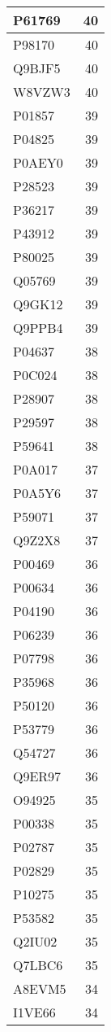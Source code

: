\documentclass[
]{book}
\theoremstyle{definition}
\theoremstyle{definition}
\theoremstyle{definition}
\theoremstyle{definition}
\theoremstyle{remark}
\begin{document}
\begin{table}
\begin{tabular}{l|r}
\hline
P61769 & 40\\
\hline
P98170 & 40\\
\hline
Q9BJF5 & 40\\
\hline
W8VZW3 & 40\\
\hline
P01857 & 39\\
\hline
P04825 & 39\\
\hline
P0AEY0 & 39\\
\hline
P28523 & 39\\
\hline
P36217 & 39\\
\hline
P43912 & 39\\
\hline
P80025 & 39\\
\hline
Q05769 & 39\\
\hline
Q9GK12 & 39\\
\hline
Q9PPB4 & 39\\
\hline
P04637 & 38\\
\hline
P0C024 & 38\\
\hline
P28907 & 38\\
\hline
P29597 & 38\\
\hline
P59641 & 38\\
\hline
P0A017 & 37\\
\hline
P0A5Y6 & 37\\
\hline
P59071 & 37\\
\hline
Q9Z2X8 & 37\\
\hline
P00469 & 36\\
\hline
P00634 & 36\\
\hline
P04190 & 36\\
\hline
P06239 & 36\\
\hline
P07798 & 36\\
\hline
P35968 & 36\\
\hline
P50120 & 36\\
\hline
P53779 & 36\\
\hline
Q54727 & 36\\
\hline
Q9ER97 & 36\\
\hline
O94925 & 35\\
\hline
P00338 & 35\\
\hline
P02787 & 35\\
\hline
P02829 & 35\\
\hline
P10275 & 35\\
\hline
P53582 & 35\\
\hline
Q2IU02 & 35\\
\hline
Q7LBC6 & 35\\
\hline
A8EVM5 & 34\\
\hline
I1VE66 & 34\\

\end{tabular}
\end{table}
\end{document}
